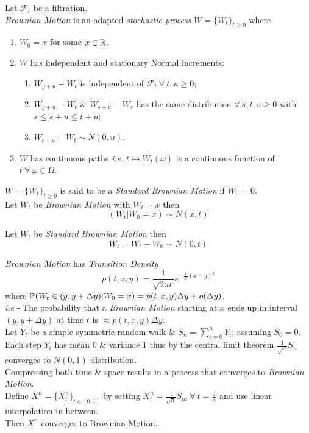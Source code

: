 \documentclass[11pt,a4paper]{article}
\begin{document}
Let $\mathcal{F}_t$ be a filtration.\\
\textit{Brownian Motion} is an adapted \textit{stochastic process} $W=\{W_t\}_{t\geq0}$ where
\begin{enumerate}[label=\roman*)]
	\item $W_0=x$ for some $x\in\mathbb{R}$.
	\item $W$ has independent and stationary Normal increments:
	\begin{enumerate}
		\item $W_{y+u}-W_t$ is independent of $\mathcal{F}_t\ \forall\ t,u\geq0$;
		\item $W_{y+u}-W_t$ \& $W_{s+u}-W_s$ has the same distribution $\forall\ s,t,u\geq 0$ with $s\leq s+u\leq t+u$;
		\item $W_{t+u}-W_t\sim N(0,u)$.
	\end{enumerate}
	\item $W$ has continuous paths \textit{i.e.} $t\mapsto W_t(\omega)$ is a continuous function of $t\ \forall\ \omega\in\Omega$.
\end{enumerate}

$W=\{W_t\}_{t\geq0}$ is said to be a \textit{Standard Brownian Motion} if $W_0=0$.\\

Let $W_t$ be \textit{Brownian Motion} with $W_t=x$ then
$$(W_t|W_0=x)\sim N(x,t)$$

Let $W_t$ be \textit{Standard Brownian Motion} then
$$W_t=W_t-W_0\sim N(0,t)$$

\textit{Brownian Motion} has \textit{Transition Density}
$$p(t,x,y)=\frac{1}{\sqrt{2\pi t}}e^{-\frac{1}{2t}(x-y)^2}$$
where $\mathbb{P}(W_t\in(y,y+\Delta y)|W_0=x)=p(t,x,y)\Delta y+o(\Delta y)$.\\
\textit{i.e} - The probability that a \textit{Brownian Motion} starting at $x$ ends up in interval $(y,y+\Delta y)$  at time $t$ is $\approx p(t,x,y)\Delta y$.\\

Let $Y_t$ be a simple symmetric random walk \& $S_n=\sum_{i=0}^nY_i$, assuming $S_0=0$.\\
Each step $Y_i$ has mean $0$ \& variance $1$ thus by the central limit theorem $\frac{1}{\sqrt{n}}S_n$ converges to $N(0,1)$ distribution.\\
Compressing both time \& space results in a process that converges to \textit{Brownian Motion}.\\
Define $X^n=\{X_t^n\}_{t\in[0,1]}$ by setting $X_t^n=\frac{1}{\sqrt{n}}S_{nt}\ \forall\ t=\frac{j}{n}$ and use linear interpolation in between.\\
Then $X^n$ converges to Brownian Motion.\\
\end{document}
